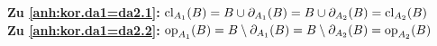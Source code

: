     \noindent
    \textbf{Zu \ref{anh:kor.da1=da2.1}:} $\text{cl}_{A_1}(B) = B \cup \partial_{A_1}(B) = B \cup \partial_{A_2}(B) = \text{cl}_{A_2}(B)$ \\

    \noindent
    \textbf{Zu \ref{anh:kor.da1=da2.2}:} $\text{op}_{A_1}(B) = B \setminus \partial_{A_1}(B) = B \setminus \partial_{A_2}(B) = \text{op}_{A_2}(B)$ \\

% 
    
